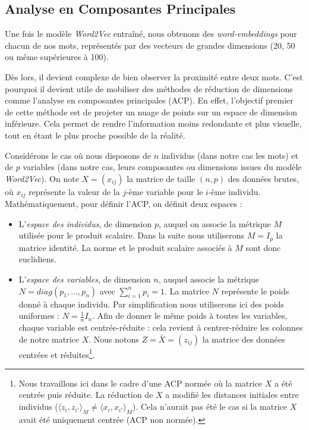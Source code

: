 \documentclass[11pt,french,french]{article}
\let\rmarkdownfootnote\footnote%
\def\footnote{\protect\rmarkdownfootnote}
\begin{document}
\subsection{Analyse en Composantes
Principales}\label{analyse-en-composantes-principales}

Une fois le modèle \emph{Word2Vec} entraîné, nous obtenons des
\emph{word-embeddings} pour chacun de nos mots, représentés par des
vecteurs de grandes dimensions (20, 50 ou même supérieures à 100).

Dès lors, il devient complexe de bien observer la proximité entre deux
mots. C'est pourquoi il devient utile de mobiliser des méthodes de
réduction de dimensions comme l'analyse en composantes principales
(ACP). En effet, l'objectif premier de cette méthode est de projeter un
nuage de points sur un espace de dimension inférieure. Cela permet de
rendre l'information moins redondante et plus visuelle, tout en étant le
plus proche possible de la réalité.

Considérons le cas où nous disposons de \(n\) individus (dans notre cas
les mots) et de \(p\) variables (dans notre cas, leurs composantes ou
dimensions issues du modèle \emph{Word2Vec}). On note \(X = (x_{ij})\)
la matrice de taille \((n,p)\) des données brutes, où \(x_{ij}\)
représente la valeur de la \(j\)-ème variable pour le \(i\)-ème
individu. Mathématiquement, pour définir l'ACP, on définit deux espaces
:

\begin{itemize}
\item
  L'\emph{espace des individus}, de dimension \(p\), auquel on associe
  la métrique \(M\) utilisée pour le produit scalaire. Dans la suite
  nous utiliserons \(M =I_p\) la matrice identité. La norme et le
  produit scalaire associés à \(M\) sont donc euclidiens.
\item
  L'\emph{espace des variables}, de dimension \(n\), auquel associe la
  métrique \(N=diag(p_1,...,p_n)\) avec \(\sum_{i=1}^np_i=1\). La
  matrice \(N\) représente le poids donné à chaque individu. Par
  simplification nous utiliserons ici des poids uniformes :
  \(N=\frac{1}{n}I_n\). Afin de donner le même poids à toutes les
  variables, chaque variable est centrée-réduite : cela revient à
  centrer-réduire les colonnes de notre matrice \(X\). Nous notons
  \(Z =\bar X= (z_{ij})\) la matrice des données centrées et
  réduites\footnote{Nous travaillons ici dans le cadre d'une ACP normée
    où la matrice \(X\) a été centrée puis réduite. La réduction de
    \(X\) a modifié les distances initiales entre individus
    (\(\langle z_i,z_{i'}\rangle_M \neq \langle x_i,x_{i'}\rangle_M\)).
    Cela n'aurait pas été le cas si la matrice \(X\) avait été
    uniquement centrée (ACP non normée).}.
\end{itemize}
\end{document}
